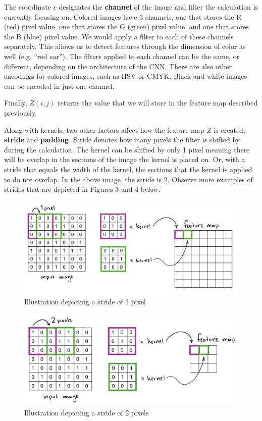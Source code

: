 \begin{flushleft}
        The coordinate $c$ designates the \textbf{channel} of the image and filter the calculation is currently focusing on. Colored images have 3 channels, one that stores the R (red) pixel value, one that stores the G (green) pixel value, and one that stores the B (blue) pixel value. We would apply a filter to each of these channels separately. This allows us to detect features through the dimension of color as well (e.g. ``red ear''). The filters applied to each channel can be the same, or different, depending on the architecture of the CNN. There are also other encodings for colored images, such as HSV or CMYK. Black and white images can be encoded in just one channel.\break
        
        Finally, $Z(i,j)$ returns the value  that we will store in the feature map described previously. \break

        Along with kernels, two other factors affect how the feature map $Z$ is created, \textbf{stride} and \textbf{padding}. Stride denotes how many pixels the filter is shifted by during the calculation. The kernel can be shifted by only 1 pixel meaning there will be overlap in the sections of the image the kernel is placed on. Or, with a stride that equals the width of the kernel, the sections that the kernel is applied to do not overlap. In the above image, the stride is 2. Observe more examples of strides that are depicted in Figures 3 and 4 below. 

        \begin{figure}[H]
            \centering
            \includegraphics[width=1\linewidth]{cv/stridedepict.png}
            \caption{Illustration depicting a stride of 1 pixel}
            \label{fig:stridedepict}
        \end{figure}

        \begin{figure}[H]
            \centering
            \includegraphics[width=1\linewidth]{cv/stride2eg.png}
            \caption{Illustration depicting a stride of 2 pixels}
            \label{fig:stride2eg}
        \end{figure}


\end{flushleft}
